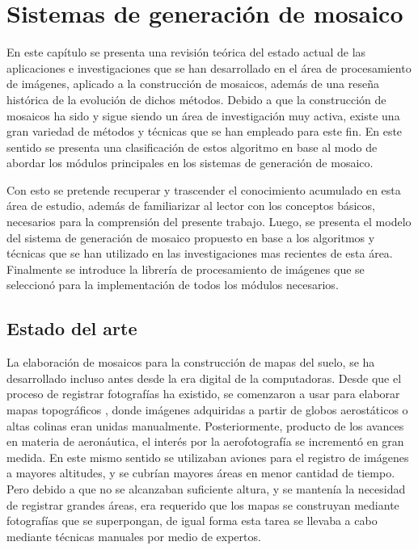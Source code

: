 \chapter{Sistemas de generación de mosaico}
\label{capitulo2}

En este capítulo se presenta una revisión teórica del estado actual de las aplicaciones e investigaciones que se han desarrollado en el área de procesamiento de imágenes, aplicado a la construcción de mosaicos, además de una reseña histórica de la evolución de dichos métodos. Debido a que la construcción de mosaicos ha sido y sigue siendo un área de investigación muy activa, existe una gran variedad de métodos y técnicas que se han empleado para este fin. En este sentido se presenta una clasificación de estos algoritmo en base al modo de abordar los módulos principales en los sistemas de generación de mosaico.

Con esto se pretende recuperar y trascender el conocimiento acumulado en esta área de estudio, además de familiarizar al lector con los conceptos básicos, necesarios para la comprensión del presente trabajo. Luego, se presenta el modelo del sistema de generación de mosaico propuesto en base a los algoritmos y técnicas que se han utilizado en las investigaciones mas recientes de esta área. Finalmente se introduce la librería de procesamiento de imágenes que se seleccionó para la implementación de todos los módulos necesarios.

\section{Estado del arte}

La elaboración de mosaicos para la construcción de mapas del suelo, se ha desarrollado incluso antes desde la era digital de la computadoras. Desde que el proceso de registrar fotografías ha existido, se comenzaron a usar para elaborar mapas topográficos \cite{primeros-mapas}, donde imágenes adquiridas a partir de globos aerostáticos o altas colinas eran unidas manualmente. Posteriormente, producto de los avances en materia de aeronáutica, el interés por la aerofotografía se incrementó en gran medida. En este mismo sentido se utilizaban aviones para el registro de imágenes a mayores altitudes, y se cubrían mayores áreas en menor cantidad de tiempo. Pero debido a que no se alcanzaban suficiente altura, y se mantenía la necesidad de registrar grandes áreas, era requerido que los mapas se construyan mediante fotografías que se superpongan, de igual forma esta tarea se llevaba a cabo mediante técnicas manuales por medio de expertos.

